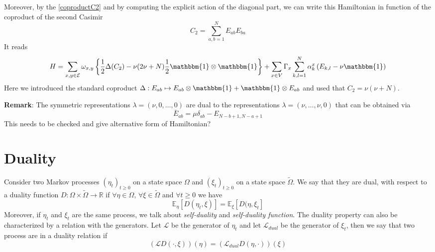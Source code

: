 \documentclass[11pt]{article}
\numberwithin{equation}{section}
\newcommand{\twoj}{\nu}
\begin{document}
Moreover, by the \eqref{coproductC2} and by computing the explicit action of the diagonal part, we can write this Hamiltonian in function of the coproduct of the second Casimir
\begin{equation}
    C_{2}=\sum_{a,b=1}^{N}E_{ab}E_{ba}
\end{equation}
It reads
\begin{equation}
	H=\sum_{x,y\in \mathcal{E}}\omega_{x,y}\left\{\frac{1}{2}\Delta(C_{2})-\twoj(2\twoj+N)\frac{1}{2}\mathbbm{1}\otimes\mathbbm{1}\right\}+\sum_{x\in V}\Gamma_{x}\sum_{k,l=1}^{N}\alpha_{k}^{x}\left(E_{k,l}-\twoj\mathbbm{1}\right)
\end{equation}
Here we introduced the standard coproduct $\Delta:E_{ab}\mapsto E_{ab}\otimes \mathbbm{1}+\mathbbm{1}\otimes E_{ab}$ and used that $C_{2}=\twoj(\twoj+N)$. 

 
\textbf{Remark}: The symmetric representations $\lambda=(\twoj,0,\ldots,0)$ are dual to the representations $\lambda=(\twoj,\ldots,\twoj,0)$ that can be obtained via 
\begin{equation}
   \bar E_{ab}=\mu\delta_{ab}-E_{N-b+1,N-a+1}
\end{equation}
{\color{red} This needs to be checked and give alternative form of Hamiltonian?}


\section{Duality}
Consider two Markov processes $(\eta_{t})_{t\geq 0}$ on a state space $\Omega$ and $(\xi_{t})_{t\geq 0}$ on a state space $\widetilde{\Omega}$. We say that they are dual, with respect to a duality function $D:\Omega\times \widetilde{\Omega}\to \mathbb{R}$ if $\forall \eta\in \Omega$, $\forall \xi\in \widetilde{\Omega}$ and $\forall t\geq 0$ we have 
\begin{equation}
    \mathbb{E}_{\eta}\left[D(\eta_{t},\xi)\right]=\mathbb{E}_{\xi}\left[D(\eta,\xi_{t}\right]
\end{equation}
Moreover, if $\eta_{t}$ and $\xi_{t}$ are the same process, we talk about \textit{self-duality} and \textit{self-duality function}. The duality property can also be characterized by a relation with the generators. Let $\mathcal{L}$ be the generator of $\eta_{t}$ and let $\mathcal{L}_{dual}$ be the generator of $\xi_{t}$, then we say that two process are in a duality relation if 
\begin{equation}
    \left(\mathcal{L}D(\cdot,\xi)\right)(\eta)=\left(\mathcal{L}_{dual}D(\eta,\cdot)\right)(\xi)
\end{equation}
\end{document}
